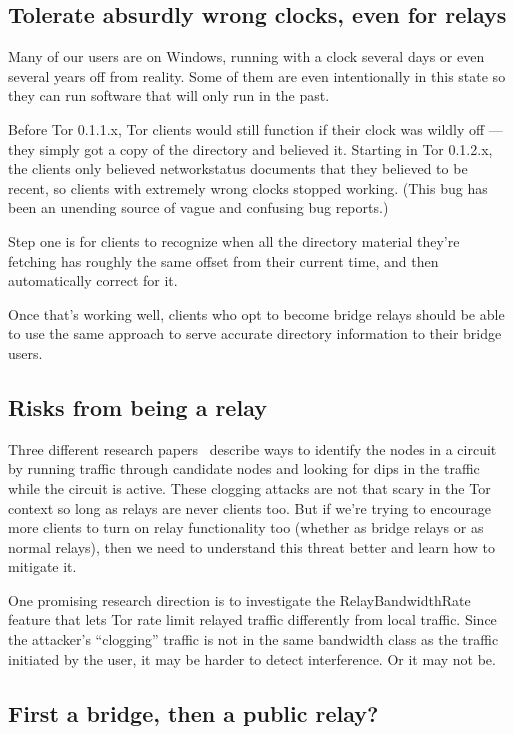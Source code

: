 \documentclass{article}
\begin{document}
\subsection{Tolerate absurdly wrong clocks, even for relays}

Many of our users are on Windows, running with a clock several days or
even several years off from reality. Some of them are even intentionally
in this state so they can run software that will only run in the past.

Before Tor 0.1.1.x, Tor clients would still function if their clock was
wildly off --- they simply got a copy of the directory and believed it.
Starting in Tor 0.1.2.x, the clients only believed networkstatus documents
that they believed to be recent, so clients with extremely wrong clocks
stopped working. (This bug has been an unending source of vague and
confusing bug reports.)

Step one is for clients to recognize when all the directory material
they're fetching has roughly the same offset from their current time,
and then automatically correct for it.

Once that's working well, clients who opt to become bridge relays should
be able to use the same approach to serve accurate directory information
to their bridge users.

\subsection{Risks from being a relay}

Three different research
papers~\cite{back01,clog-the-queue,attack-tor-oak05} describe ways to
identify the nodes in a circuit by running traffic through candidate nodes
and looking for dips in the traffic while the circuit is active. These
clogging attacks are not that scary in the Tor context so long as relays
are never clients too. But if we're trying to encourage more clients to
turn on relay functionality too (whether as bridge relays or as normal
relays), then we need to understand this threat better and learn how to
mitigate it.

One promising research direction is to investigate the RelayBandwidthRate
feature that lets Tor rate limit relayed traffic differently from local
traffic. Since the attacker's ``clogging'' traffic is not in the same
bandwidth class as the traffic initiated by the user, it may be harder
to detect interference. Or it may not be.

\subsection{First a bridge, then a public relay?}
\end{document}
